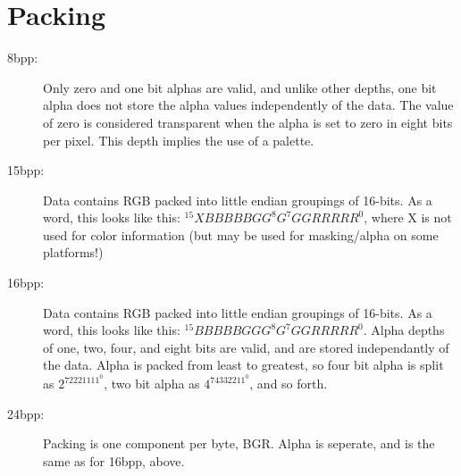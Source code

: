 %
% 
% 
\def\FileCreated{Fri Jun 22 17:09:00 2001}
\def\FileRevised{Fri Jun 22 18:25:00 2001}

\section{Packing}

\begin{description}
\item [8bpp:]
Only zero and one bit alphas are valid, and unlike other depths,
one bit alpha does not store the alpha values independently of the data.
The value of zero is considered transparent when the alpha is set to
zero in eight bits per pixel. This depth implies the use of a palette.

\item [15bpp:]
Data contains RGB packed into little endian groupings of 16-bits.
As a word, this looks like this: $^{15}XBBBBBGG^8 G^7GGRRRRR^0$,
where X is not used for color information (but may be used for masking/alpha
on some platforms!)

\item [16bpp:]
Data contains RGB packed into little endian groupings of 16-bits.
As a word, this looks like this: $^{15}BBBBBGGG^8 G^7GGRRRRR^0$.
Alpha depths of one, two, four, and eight bits are valid, and are stored
independantly of the data. Alpha is packed from least to greatest, so
four bit alpha is split as $2^72221111^0$, two bit alpha as
$4^74332211^0$, and so forth.

\item [24bpp:]
Packing is one component per byte, BGR. Alpha is seperate, and
is the same as for 16bpp, above.

\end{description}

